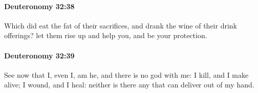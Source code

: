 		\paragraph{Deuteronomy 32:38} %
			\label{DEUTERONOMY-32-38}

			Which did eat the fat of their sacrifices, and drank the wine of their drink offerings? let them rise up and help you, and be your protection.


		\paragraph{Deuteronomy 32:39} %
			\label{DEUTERONOMY-32-39}

			See now that I, even I, am he, and there is no god with me: I kill, and I make alive; I wound, and I heal: neither is there any that can deliver out of my hand.


